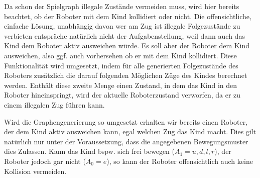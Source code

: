 Da schon der Spielgraph illegale Zustände vermeiden muss, wird hier bereits beachtet, ob der Roboter mit dem Kind kollidiert oder nicht. Die offensichtliche, einfache Lösung, unabhängig davon wer am Zug ist illegale Folgezustände zu verbieten entspräche natürlich nicht der Aufgabenstellung, weil dann auch das Kind dem Roboter aktiv ausweichen würde. Es soll aber der Roboter dem Kind ausweichen, also ggf. auch vorhersehen ob er mit dem Kind kollidiert. Diese Funktionalität wird umgesetzt, indem für alle generierten Folgezustände des Roboters zusätzlich die darauf folgenden Möglichen Züge des Kindes berechnet werden. Enthält diese zweite Menge einen Zustand, in dem das Kind in den Roboter hineinspringt, wird der aktuelle Roboterzustand verworfen, da er zu einem illegalen Zug führen kann.

Wird die Graphengenerierung so umgesetzt erhalten wir bereits einen Roboter, der dem Kind aktiv ausweichen kann, egal welchen Zug das Kind macht. Dies gilt natürlich nur unter der Voraussetzung, dass die angegebenen Bewegungsmuster dies Zulassen. Kann das Kind bspw. sich frei bewegen ($A_1 = {u,d,l,r}$), der Roboter jedoch gar nicht ($A_0 = {e}$), so kann der Roboter offensichtlich auch keine Kollision vermeiden.


